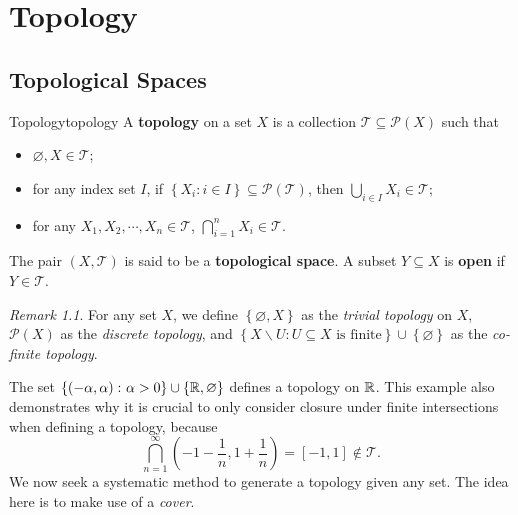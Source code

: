 \documentclass[math]{amznotes}
\theoremstyle{remark}
\newtheorem*{remark}{Remark}
\begin{document}
\tableofcontents
\chapter{Topology}
\section{Topological Spaces}
\begin{dfnbox}{Topology}{topology}
    A {\color{red} \textbf{topology}} on a set $X$ is a collection $\mathcal{T} \subseteq \mathcal{P}\left(X\right)$ such that 
    \begin{itemize}
        \item $\varnothing, X \in \mathcal{T}$;
        \item for any index set $I$, if $\left\{X_i \colon i \in I\right\} \subseteq \mathcal{P}\left(\mathcal{T}\right)$, then $\bigcup_{i \in I}X_i \in \mathcal{T}$;
        \item for any $X_1, X_2, \cdots, X_n \in \mathcal{T}$, $\bigcap_{i = 1}^nX_i \in \mathcal{T}$.
    \end{itemize}
    The pair $\left(X, \mathcal{T}\right)$ is said to be a {\color{red} \textbf{topological space}}. A subset $Y \subseteq X$ is {\color{red} \textbf{open}} if $Y \in \mathcal{T}$.
\end{dfnbox}
\begin{notebox}
    \begin{remark}
        For any set $X$, we define $\left\{\varnothing, X\right\}$ as the \textit{trivial topology} on $X$, $\mathcal{P}\left(X\right)$ as the \textit{discrete topology}, and $\left\{X \backslash U \colon U \subseteq X \textrm{ is finite}\right\} \cup \left\{\varnothing\right\}$ as the \textit{co-finite topology}.
    \end{remark}
\end{notebox}
The set $\left\{\left(-\alpha, \alpha\right) \colon \alpha > 0\right\} \cup \left\{\mathbb{R}, \varnothing\right\}$ defines a topology on $\mathbb{R}$. This example also demonstrates why it is crucial to only consider closure under finite intersections when defining a topology, because
\begin{equation*}
    \bigcap_{n = 1}^{\infty}\left(-1 - \frac{1}{n}, 1 + \frac{1}{n}\right) = [-1, 1] \notin \mathcal{T}.
\end{equation*}
We now seek a systematic method to generate a topology given any set. The idea here is to make use of a \textit{cover}.
\end{document}
